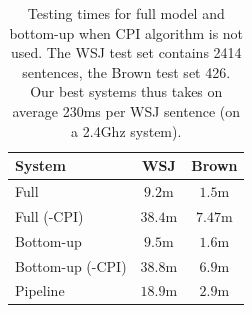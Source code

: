 \begin{table}[ht]

    \centering
    \begin{tabular}{|p{3.0cm}|c|c|}\hline
        System                           & WSJ       & Brown   \\\hline 
        Full                             & $9.2$m    & $1.5$m  \\
        Full (-CPI)                      & $38.4$m   & $7.47$m  \\
        Bottom-up                        & $9.5$m    & $1.6$m  \\
        Bottom-up (-CPI)                 & $38.8$m   & $6.9$m  \\
        Pipeline                         & $18.9$m   & $2.9$m  \\\hline
    \end{tabular}
    \caption{Testing times for full model and bottom-up when CPI algorithm is
    not used. The WSJ test set contains 2414 sentences, the Brown test set 426. Our best systems thus takes on average 230ms per WSJ sentence (on a 2.4Ghz system). }
    \label{tbl:nocpi}
\end{table}


